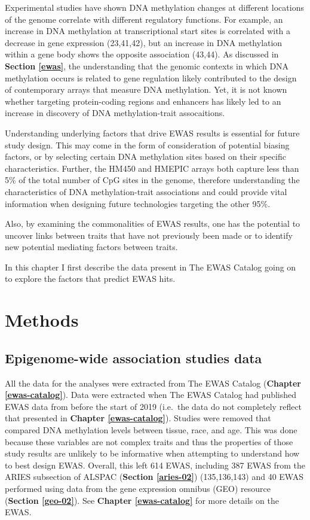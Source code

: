 \documentclass[11pt,oneside]{bristolthesis}
\begin{document}
Experimental studies have shown DNA methylation changes at different locations of the genome correlate with different regulatory functions. For example, an increase in DNA methylation at transcriptional start sites is correlated with a decrease in gene expression (23,41,42), but an increase in DNA methylation within a gene body shows the opposite association (43,44). As discussed in \textbf{Section \ref{ewas}}, the understanding that the genomic contexts in which DNA methylation occurs is related to gene regulation likely contributed to the design of contemporary arrays that measure DNA methylation. Yet, it is not known whether targeting protein-coding regions and enhancers has likely led to an increase in discovery of DNA methylation-trait assocaitions.

Understanding underlying factors that drive EWAS results is essential for future study design. This may come in the form of consideration of potential biasing factors, or by selecting certain DNA methylation sites based on their specific characteristics. Further, the HM450 and HMEPIC arrays both capture less than 5\% of the total number of CpG sites in the genome, therefore understanding the characteristics of DNA methylation-trait associations and could provide vital information when designing future technologies targeting the other 95\%.

Also, by examining the commonalities of EWAS results, one has the potential to uncover links between traits that have not previously been made or to identify new potential mediating factors between traits.

In this chapter I first describe the data present in The EWAS Catalog going on to explore the factors that predict EWAS hits.

\newpage

\hypertarget{methods-04}{%
\section{Methods}\label{methods-04}}

\hypertarget{ewas-data-04}{%
\subsection{Epigenome-wide association studies data}\label{ewas-data-04}}

All the data for the analyses were extracted from The EWAS Catalog (\textbf{Chapter \ref{ewas-catalog}}). Data were extracted when The EWAS Catalog had published EWAS data from before the start of 2019 (i.e.~the data do not completely reflect that presented in \textbf{Chapter \ref{ewas-catalog}}). Studies were removed that compared DNA methylation levels between tissue, race, and age. This was done because these variables are not complex traits and thus the properties of those study results are unlikely to be informative when attempting to understand how to best design EWAS. Overall, this left 614 EWAS, including 387 EWAS from the ARIES subsection of ALSPAC (\textbf{Section \ref{aries-02}}) (135,136,143) and 40 EWAS performed using data from the gene expression omnibus (GEO) resource (\textbf{Section \ref{geo-02}}). See \textbf{Chapter \ref{ewas-catalog}} for more details on the EWAS.
\end{document}
